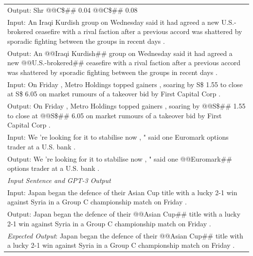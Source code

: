 \documentclass{article}
\begin{document}
\begin{table}[th!]
{\begin{tabular}{l}
Output: Shr @@C\$\#\# 0.04 @@C\$\#\# 0.08 \\
Input: An Iraqi Kurdish group on Wednesday said it had agreed a new U.S.-brokered ceasefire with a rival faction after a previous accord was shattered by sporadic fighting between the groups in recent days . \\
Output: An @@Iraqi Kurdish\#\# group on Wednesday said it had agreed a new @@U.S.-brokered\#\# ceasefire with a rival faction after a previous accord was shattered by sporadic fighting between the groups in recent days . \\
Input: On Friday , Metro Holdings topped gainers , soaring by S\$ 1.55 to close at S\$ 6.05 on market rumours of a takeover bid by First Capital Corp . \\
Output: On Friday , Metro Holdings topped gainers , soaring by @@S\$\#\# 1.55 to close at @@S\$\#\# 6.05 on market rumours of a takeover bid by First Capital Corp . \\
Input: We 're looking for it to stabilise now , " said one Euromark options trader at a U.S. bank . \\
Output: We 're looking for it to stabilise now , " said one @@Euromark\#\# options trader at a U.S. bank . \\\midrule
\textit{Input Sentence and GPT-3 Output} \\
Input: Japan began the defence of their Asian Cup title with a lucky 2-1 win against Syria in a Group C championship match on Friday . \\
Output: Japan began the defence of their @@Asian Cup\#\# title with a lucky 2-1 win against Syria in a Group C championship match on Friday .\\
{\color{blue}\it Expected Output}: Japan began the defence of their @@Asian Cup\#\# title with a lucky 2-1 win against Syria in a Group C championship match on Friday . \\\bottomrule


\end{tabular}}
\end{table}
\end{document}
